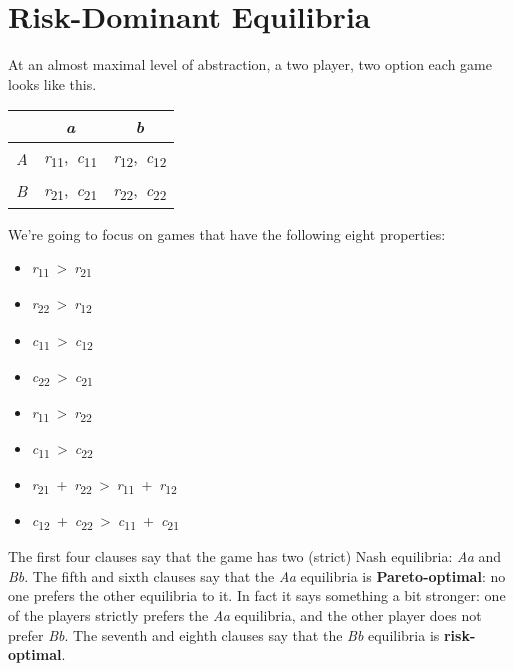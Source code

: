 \documentclass[
  11pt,
]{book}
\providecommand{\tightlist}{%
  \setlength{\itemsep}{0pt}\setlength{\parskip}{0pt}}
\begin{document}
\hypertarget{globalgame}{%
\section{Risk-Dominant Equilibria}\label{globalgame}}

At an almost maximal level of abstraction, a two player, two option each game looks like this.

\begin{longtable}[]{@{}lcc@{}}
\toprule\noalign{}
& \emph{a} & \emph{b} \\
\midrule\noalign{}
\endhead
\bottomrule\noalign{}
\endlastfoot
\emph{A} & \emph{r}\textsubscript{11},~\emph{c}\textsubscript{11} & \emph{r}\textsubscript{12},~\emph{c}\textsubscript{12} \\
\emph{B} & \emph{r}\textsubscript{21},~\emph{c}\textsubscript{21} & \emph{r}\textsubscript{22},~\emph{c}\textsubscript{22} \\
\end{longtable}

We're going to focus on games that have the following eight properties:

\begin{itemize}
\tightlist
\item
  \emph{r}\textsubscript{11}~\textgreater~\emph{r}\textsubscript{21}
\item
  \emph{r}\textsubscript{22}~\textgreater~\emph{r}\textsubscript{12}
\item
  \emph{c}\textsubscript{11}~\textgreater~\emph{c}\textsubscript{12}
\item
  \emph{c}\textsubscript{22}~\textgreater~\emph{c}\textsubscript{21}
\item
  \emph{r}\textsubscript{11}~\textgreater~\emph{r}\textsubscript{22}
\item
  \emph{c}\textsubscript{11}~\textgreater~\emph{c}\textsubscript{22}
\item
  \emph{r}\textsubscript{21}~+~\emph{r}\textsubscript{22}~\textgreater~\emph{r}\textsubscript{11}~+~\emph{r}\textsubscript{12}
\item
  \emph{c}\textsubscript{12}~+~\emph{c}\textsubscript{22}~\textgreater~\emph{c}\textsubscript{11}~+~\emph{c}\textsubscript{21}
\end{itemize}

The first four clauses say that the game has two (strict) Nash equilibria: \emph{Aa} and \emph{Bb}. The fifth and sixth clauses say that the \emph{Aa} equilibria is \textbf{Pareto-optimal}: no one prefers the other equilibria to it. In fact it says something a bit stronger: one of the players strictly prefers the \emph{Aa} equilibria, and the other player does not prefer \emph{Bb}. The seventh and eighth clauses say that the \emph{Bb} equilibria is \textbf{risk-optimal}.
\end{document}
